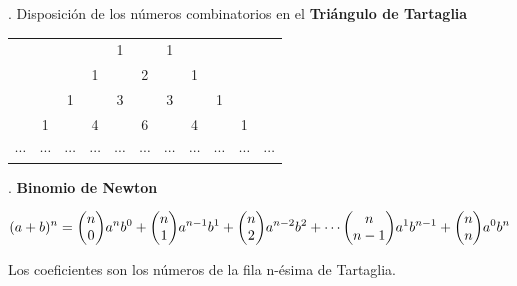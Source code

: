 \begin{example}
	. Disposición de los números combinatorios en el \textbf{Triángulo de Tartaglia}	
	
	\begin{table}[H]
	\centering
	\begin{tabular}{ccccccccccc}
        	 &          &          &          & 1        &          & 1        	&          &          &          &          \\
         	&          &          & 1        &          & 2        &          	& 1        &          &          &          \\
         	&          & 1        &          & 3        &          & 3        	&          & 1        &          &          \\
        	 & 1        &          & 4        &          & 6        &          	& 4        &          & 1        &          \\
		$\cdots$ & $\cdots$ & $\cdots$ & $\cdots$ & $\cdots$ & $\cdots$ & $\cdots$ & $\cdots$ & $\cdots$ & $\cdots$ & $\cdots$
	\end{tabular}
\end{table}
\end{example}

\begin{theorem}
	. \textbf{Binomio de Newton}
	

$$(a+b)^n  = \mqty(n\\0)a^nb^0+\mqty(n\\1)a^{n-1}b^1+\mqty(n\\2)a^{n-2}b^2+ \cdots \mqty(n\\n-1)a^1b^{n-1}+\mqty(n\\n)a^0b^n $$

\vspace{2mm} Los coeficientes son los números de la fila n-ésima de Tartaglia.
	 
\end{theorem}


